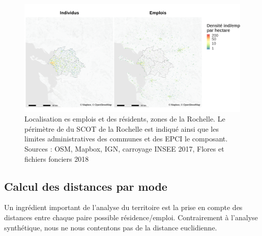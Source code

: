 \documentclass[
  10pt,
  a4paper,
  numbers=noendperiod,
  DIV=12]{scrartcl}
\begin{document}
\begin{figure}[htb]

{\centering \includegraphics[width=1\textwidth,height=\textheight]{output/popemp.png}

}

\caption[Localisation des résidents et des
emplois]{\label{fig-zoneslr}Localisation es emplois et des résidents,
zones de la Rochelle. Le périmètre de du SCOT de la Rochelle est indiqué
ainsi que les limites administratives des communes et des EPCI le
composant. Sources : OSM, Mapbox, IGN, carroyage INSEE 2017, Flores et
fichiers fonciers 2018}

\end{figure}

\hypertarget{calcul-des-distances-par-mode}{%
\subsection{Calcul des distances par
mode}\label{calcul-des-distances-par-mode}}

Un ingrédient important de l'analyse du territoire est la prise en
compte des distances entre chaque paire possible résidence/emploi.
Contrairement à l'analyse synthétique, nous ne nous contentons pas de la
distance euclidienne.
\end{document}
